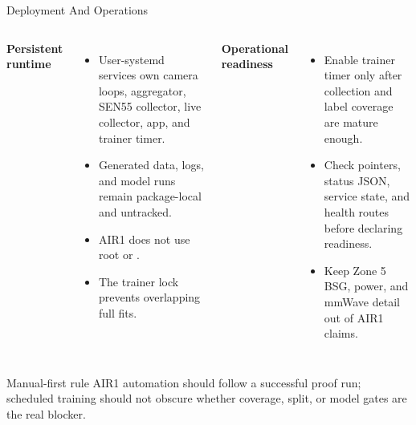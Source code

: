 \documentclass[aspectratio=169]{beamer}
\begin{document}
\begin{frame}[shrink=4]{Deployment And Operations}
\begin{columns}[T,onlytextwidth]
\textbf{Persistent runtime}
\begin{itemize}
  \item User-systemd services own camera loops, aggregator, SEN55 collector, live collector, app, and trainer timer.
  \item Generated data, logs, and model runs remain package-local and untracked.
  \item AIR1 does not use root  or .
  \item The trainer lock prevents overlapping full fits.
\end{itemize}

\textbf{Operational readiness}
\begin{itemize}
  \item Enable trainer timer only after collection and label coverage are mature enough.
  \item Check pointers, status JSON, service state, and health routes before declaring readiness.
  \item Keep Zone 5 BSG, power, and mmWave detail out of AIR1 claims.
\end{itemize}
\end{columns}
\tightsep
\begin{block}{Manual-first rule}
\small AIR1 automation should follow a successful proof run; scheduled training should not obscure whether coverage, split, or model gates are the real blocker.
\end{block}
\end{frame}
\end{document}
